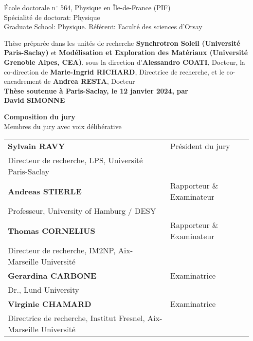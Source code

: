 \begin{titlepage}
École doctorale n$^{\circ}$ 564, Physique en Île-de-France (PIF)\\
\small Spécialité de doctorat: Physique\\
\small Graduate School: Physique. Référent: Faculté des sciences d’Orsay\\
\vspace{6mm}

\footnotesize Thèse préparée dans les unités de recherche \textbf{Synchrotron Soleil (Université Paris-Saclay)} et \textbf{Modélisation et Exploration des Matériaux (Université Grenoble Alpes, CEA)}, sous la direction d'\textbf{Alessandro COATI}, Docteur, la co-direction de \textbf{Marie-Ingrid RICHARD}, Directrice de recherche, et le co-encadrement de \textbf{Andrea RESTA}, Docteur\\
\vspace{15mm}
\textbf{Thèse soutenue à Paris-Saclay, le 12 janvier 2024, par}\\
\bigskip
\Large {\color{Prune} \textbf{David SIMONNE}}

\vspace{\fill} %

\bigskip
\flushleft
\small {\color{Prune} \textbf{Composition du jury}}\\
{\color{Prune} \scriptsize {Membres du jury avec voix délibérative}} \\
\vspace{2mm}
\scriptsize
\begin{tabular}{|p{10cm}l}
\arrayrulecolor{Prune}
\textbf{Sylvain RAVY} & Président du jury\\
Directeur de recherche, LPS, Université Paris-Saclay & \\
\textbf{Andreas STIERLE} & Rapporteur \& Examinateur \\
Professeur, University of Hamburg / DESY & \\
\textbf{Thomas CORNELIUS} & Rapporteur \& Examinateur \\
Directeur de recherche, IM2NP, Aix-Marseille Université & \\
\textbf{Gerardina CARBONE} & Examinatrice \\
Dr., Lund University & \\
\textbf{Virginie CHAMARD} & Examinatrice \\
Directrice de recherche, Institut Fresnel, Aix-Marseille Université & \\
\end{tabular}
\vspace{6mm}

\end{titlepage}